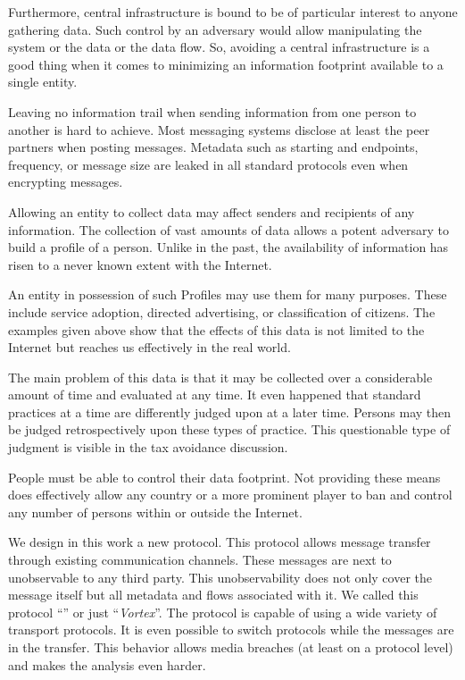 Furthermore, central infrastructure is bound to be of particular interest to anyone gathering data. Such control by an adversary would allow manipulating the system or the data or the data flow. So, avoiding a central infrastructure is a good thing when it comes to minimizing an information footprint available to a single entity.

Leaving no information trail when sending information from one person to another is hard to achieve. Most messaging systems disclose at least the peer partners when posting messages. Metadata such as starting and endpoints, frequency, or message size are leaked in all standard protocols even when encrypting messages.

Allowing an entity to collect data may affect senders and recipients of any information. The collection of vast amounts of data allows a potent adversary to build a  profile of a person. Unlike in the past, the availability of information has risen to a never known extent with the Internet.

An entity in possession of such Profiles may use them for many purposes. These include service adoption, directed advertising, or classification of citizens. The examples given above show that the effects of this data is not limited to the Internet but reaches us effectively in the real world.

The main problem of this data is that it may be collected over a considerable amount of time and evaluated at any time. It even happened that standard practices at a time are differently judged upon at a later time. Persons may then be judged retrospectively upon these types of practice. This questionable type of judgment is visible in the tax avoidance discussion\cite{Amat1999}. 

People must be able to control their data footprint. Not providing these means does effectively allow any country or a more prominent player to ban and control any number of persons within or outside the Internet. 

We design in this work a new protocol. This protocol allows message transfer through existing communication channels. These messages are next to unobservable to any third party. This unobservability does not only cover the message itself but all metadata and flows associated with it. We called this protocol ``\MessageVortex'' or just ``\emph{Vortex}''. The protocol is capable of using a wide variety of transport protocols. It is even possible to switch protocols while the messages are in the transfer. This behavior allows media breaches (at least on a protocol level) and makes the analysis even harder.

